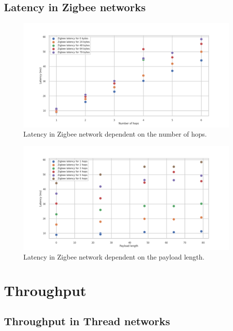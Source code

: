 \subsection{Latency in Zigbee networks}

\begin{figure}[H]
    \centering
    \includegraphics[scale=0.45]{images/Zigbee_Latency_all.png}
    \caption{Latency in Zigbee network dependent on the number of hops.}
    \label{fig:zigbee_latency_all}
\end{figure}

\begin{figure}[H]
    \centering
    \includegraphics[scale=0.45]{images/Zigbee_Latency_vs_length.png}
    \caption{Latency in Zigbee network dependent on the payload length. }
    \label{fig:zigbee_latency_length}
\end{figure}

\section{Throughput}
\subsection{Throughput in Thread networks}

